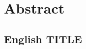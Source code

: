 \documentclass[./\jobname.tex]{subfiles}
\begin{document}
\chapter*{Abstract}
\section*{English TITLE}
\lipsum[5]
\end{document}
